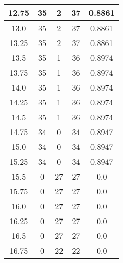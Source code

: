 \documentclass[letterpaper, 12pt]{article}
\begin{document}
\begin{longtable}{|c|c|c|c|c|}
\hline
12.75 & 35 & 2 & 37 & 0.8861 \\
\hline
13.0 & 35 & 2 & 37 & 0.8861 \\
\hline
13.25 & 35 & 2 & 37 & 0.8861 \\
\hline
13.5 & 35 & 1 & 36 & 0.8974 \\
\hline
13.75 & 35 & 1 & 36 & 0.8974 \\
\hline
14.0 & 35 & 1 & 36 & 0.8974 \\
\hline
14.25 & 35 & 1 & 36 & 0.8974 \\
\hline
14.5 & 35 & 1 & 36 & 0.8974 \\
\hline
14.75 & 34 & 0 & 34 & 0.8947 \\
\hline
15.0 & 34 & 0 & 34 & 0.8947 \\
\hline
15.25 & 34 & 0 & 34 & 0.8947 \\
\hline
15.5 & 0 & 27 & 27 & 0.0 \\
\hline
15.75 & 0 & 27 & 27 & 0.0 \\
\hline
16.0 & 0 & 27 & 27 & 0.0 \\
\hline
16.25 & 0 & 27 & 27 & 0.0 \\
\hline
16.5 & 0 & 27 & 27 & 0.0 \\
\hline
16.75 & 0 & 22 & 22 & 0.0 \\
\hline
\end{longtable}
\end{document}
